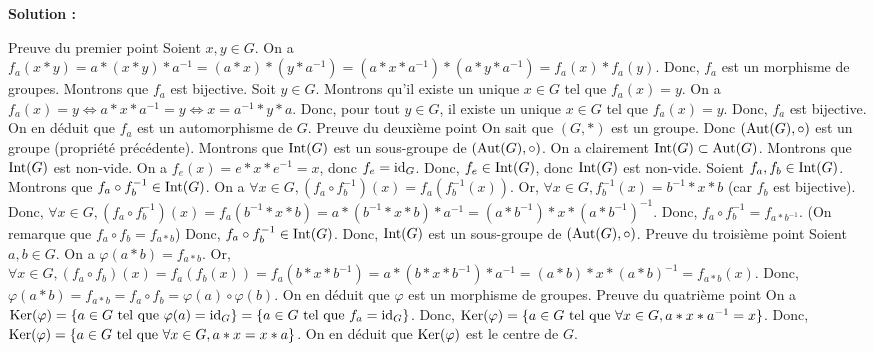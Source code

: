 \documentclass[12pt, a4paper]{report}
\begin{document}
\begin{exercise}
    \textbf{Solution :}
    \begin{outline}
        \1 Preuve du premier point
            \2 Soient $x,y \in G$.
            \2 On a $f_a(x * y) = a * (x * y) * a^{-1} = (a * x) * (y * a^{-1}) = (a * x * a^{-1}) * (a * y * a^{-1}) = f_a(x) * f_a(y)$.
            \2 Donc, $f_a$ est un morphisme de groupes.
            \2 Montrons que $f_a$ est bijective.
                \3 Soit $y \in G$. Montrons qu'il existe un unique $x \in G$ tel que $f_a(x) = y$.
                \3 On a $f_a(x) = y \iff a * x * a^{-1} = y \iff x = a^{-1} * y * a$.
                \3 Donc, pour tout $y \in G$, il existe un unique $x \in G$ tel que $f_a(x) = y$.
            \2 Donc, $f_a$ est bijective.
            \2 On en déduit que $f_a$ est un automorphisme de $G$.
        \1 Preuve du deuxième point
            \2 On sait que $(G,*)$ est un groupe.
            \2 Donc $(\mathrm{Aut}(G),\circ)$ est un groupe (propriété précédente).
            \2 Montrons que $\mathrm{Int}(G)$ est un sous-groupe de $(\mathrm{Aut}(G),\circ)$.
                \3 On a clairement $\mathrm{Int}(G) \subset \mathrm{Aut}(G)$.
                \3 Montrons que $\mathrm{Int}(G)$ est non-vide.
                    \4 On a $f_e(x) = e * x * e^{-1} = x$, donc $f_e = \mathrm{id}_G$.
                    \4 Donc, $f_e \in \mathrm{Int}(G)$, donc $\mathrm{Int}(G)$ est non-vide.
                \3 Soient $f_a, f_b \in \mathrm{Int}(G)$. Montrons que $f_a \circ f_b^{-1} \in \mathrm{Int}(G)$.
                    \4 On a $\forall x \in G, (f_a \circ f_b^{-1})(x) = f_a(f_b^{-1}(x))$.
                    \4 Or, $\forall x \in G, f_b^{-1}(x) = b^{-1} * x * b$ (car $f_b$ est bijective).
                    \4 Donc, $\forall x \in G, (f_a \circ f_b^{-1})(x) = f_a(b^{-1} * x * b) = a * (b^{-1} * x * b) * a^{-1} = (a * b^{-1}) * x * (a * b^{-1})^{-1}$.
                    \4 Donc, $f_a \circ f_b^{-1} = f_{a*b^{-1}}$.
                    \4 (On remarque que $f_a\circ f_b = f_{a*b}$)
                    \4 Donc, $f_a \circ f_b^{-1} \in \mathrm{Int}(G)$.
                \3 Donc, $\mathrm{Int}(G)$ est un sous-groupe de $(\mathrm{Aut}(G),\circ)$.
        \1 Preuve du troisième point
            \2 Soient $a,b \in G$.
            \2 On a $\varphi(a * b) = f_{a*b}$.
            \2 Or, $\forall x \in G, (f_a \circ f_b)(x) = f_a(f_b(x)) = f_a(b * x * b^{-1}) = a * (b * x * b^{-1}) * a^{-1} = (a * b) * x * (a * b)^{-1} = f_{a*b}(x)$.
            \2 Donc, $\varphi(a * b) = f_{a*b} = f_a \circ f_b = \varphi(a) \circ \varphi(b)$.
            \2 On en déduit que $\varphi$ est un morphisme de groupes.
        \1 Preuve du quatrième point
            \2 On a $\mathrm{Ker}(\varphi) = \{a \in G \text{ tel que } \varphi(a) = \mathrm{id}_G\} = \{a \in G \text{ tel que } f_a = \mathrm{id}_G\}$.
            \2 Donc, $\mathrm{Ker}(\varphi) = \{a \in G \text{ tel que } \forall x \in G, a * x * a^{-1} = x\}$.
            \2 Donc, $\mathrm{Ker}(\varphi) = \{a \in G \text{ tel que } \forall x \in G, a * x = x * a\}$.
            \2 On en déduit que $\mathrm{Ker}(\varphi)$ est le centre de $G$.
    \end{outline}
\end{exercise}
\end{document}
